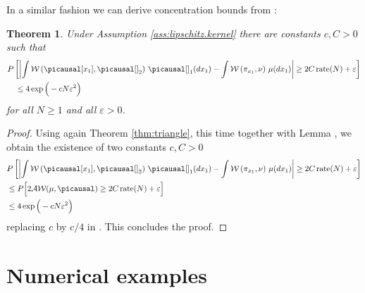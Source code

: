 \documentclass[10pt]{amsart}
\newtheorem{theorem}{Theorem}[section]
\begin{document}
In a similar fashion we can derive concentration bounds from \cite[Lemma 1.4]{jwb}:

\begin{theorem}
Under Assumption \ref{ass:lipschitz.kernel} there are constants $c,C>0$ such that
\begin{align*}
&P\left[ \left| \int \mathcal{W}\left(\picausal[x_1],\picausal[]_2\right)\,\picausal[]_1(dx_1) -\int \mathcal{W}\left(\pi_{x_1},\nu\right)\,\mu(dx_1) \right|  \geq 2C\mathop{\mathrm{rate}}(N)+\varepsilon \right]\\
	&\quad \leq 4\exp\Big( -cN\varepsilon^2 \Big) 
\end{align*} 
	for all $N\geq 1$ and all $\varepsilon>0$.
\end{theorem}

\begin{proof}
Using again Theorem \ref{thm:triangle}, this time together with Lemma \cite[Lemma 1.4]{jwb}, we obtain the existence of two constants $c,C>0$
\begin{align*}
&P\left[ \left| \int \mathcal{W}\left(\picausal[x_1],\picausal[]_2\right)\,\picausal[]_1(dx_1) -\int \mathcal{W}\left(\pi_{x_1},\nu\right)\,\mu(dx_1) \right|  \geq 2C\mathop{\mathrm{rate}}(N)+\varepsilon \right]\\
 & \le P\Big[ 2\mathcal{AW}(\mu,\picausal)  \geq 2C\mathop{\mathrm{rate}}(N)+\varepsilon \Big]\\
	& \leq 4\exp\Big( -cN\varepsilon^2 \Big) 
\end{align*}
replacing $c$ by $c/4$ in \cite[Lemma 1.4]{jwb}. This concludes the proof.
\end{proof}

\section{Numerical examples}\label{sec:7}
\end{document}
